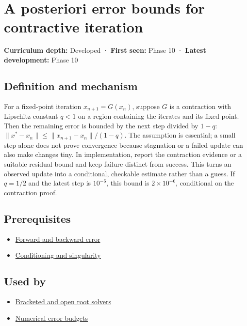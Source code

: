 \hypertarget{appendix-d83b0ad1be7f}{}\label{referencestart:appendix-d83b0ad1be7f}
\section{A posteriori error bounds for contractive iteration}\label{appendix-d83b0ad1be7f-a-posteriori-error-bounds-for-contractive-iteration}

\textbf{Curriculum depth:} Developed · \textbf{First seen:} Phase 10 · \textbf{Latest development:} Phase 10

\subsection{Definition and mechanism}\label{appendix-d83b0ad1be7f-definition-and-mechanism}

For a fixed-point iteration \(x_{n+1}=G(x_n)\), suppose \(G\) is a contraction with Lipschitz constant \(q<1\) on a region containing the iterates and its fixed point. Then the remaining error is bounded by the next step divided by \(1-q\): \(\|x^*-x_n\|\le\|x_{n+1}-x_n\|/(1-q)\). The assumption is essential; a small step alone does not prove convergence because stagnation or a failed update can also make changes tiny. In implementation, report the contraction evidence or a suitable residual bound and keep failure distinct from success. This turns an observed update into a conditional, checkable estimate rather than a guess. If \(q=1/2\) and the latest step is \(10^{-6}\), this bound is \(2\times10^{-6}\), conditional on the contraction proof.

\subsection{Prerequisites}\label{appendix-d83b0ad1be7f-prerequisites}

\begin{itemize}
\tightlist
\item
  \hyperref[appendix-a7fbaf6d1b1c]{Forward and backward error}
\item
  \hyperref[appendix-8f6a01f284a7]{Conditioning and singularity}
\end{itemize}

\subsection{Used by}\label{appendix-d83b0ad1be7f-used-by}

\begin{itemize}
\tightlist
\item
  \hyperref[appendix-f63eb850796d]{Bracketed and open root solvers}
\item
  \hyperref[appendix-31b8c295e05f]{Numerical error budgets}
\end{itemize}

